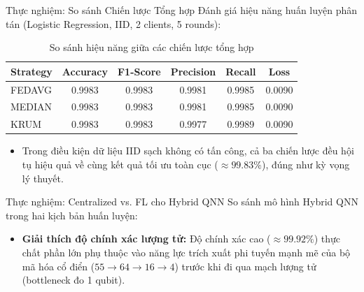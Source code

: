 \documentclass[10pt]{beamer}
\begin{document}
\begin{frame}{Thực nghiệm: So sánh Chiến lược Tổng hợp}
    Đánh giá hiệu năng huấn luyện phân tán (Logistic Regression, IID, 2 clients, 5 rounds):
    \begin{table}
        \centering
        \begin{tabular}{|l|c|c|c|c|c|}
            \hline
            \textbf{Strategy} & \textbf{Accuracy} & \textbf{F1-Score} & \textbf{Precision} & \textbf{Recall} & \textbf{Loss} \\ \hline
            FEDAVG & 0.9983 & 0.9983 & 0.9981 & 0.9985 & 0.0090 \\ \hline
            MEDIAN & 0.9983 & 0.9983 & 0.9981 & 0.9985 & 0.0090 \\ \hline
            KRUM & 0.9983 & 0.9983 & 0.9977 & 0.9989 & 0.0090 \\ \hline
        \end{tabular}
        \caption{So sánh hiệu năng giữa các chiến lược tổng hợp}
    \end{table}
    \begin{itemize}
        \item Trong điều kiện dữ liệu IID sạch không có tấn công, cả ba chiến lược đều hội tụ hiệu quả về cùng kết quả tối ưu toàn cục ($\approx 99.83\%$), đúng như kỳ vọng lý thuyết.
    \end{itemize}
\end{frame}

\begin{frame}{Thực nghiệm: Centralized vs. FL cho Hybrid QNN}
    So sánh mô hình Hybrid QNN trong hai kịch bản huấn luyện:
    \begin{table}
        \centering
        \caption{So sánh Centralized vs. Federated Learning cho Hybrid QNN}
    \end{table}
    \begin{itemize}
        \item \textbf{Giải thích độ chính xác lượng tử:} Độ chính xác cao ($\approx 99.92\%$) thực chất phần lớn phụ thuộc vào năng lực trích xuất phi tuyến mạnh mẽ của bộ mã hóa cổ điển ($55 \to \allowbreak 64 \to \allowbreak 16 \to \allowbreak 4$) trước khi đi qua mạch lượng tử (bottleneck đo 1 qubit).
    \end{itemize}
\end{frame}
\end{document}
